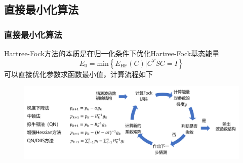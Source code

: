 \documentclass[10pt,aspectratio=43,mathserif,UTF8]{beamer}
\begin{document}
\subsection{直接最小化算法}
\begin{frame}
	\frametitle{直接最小化算法}
	Hartree-Fock方法的本质是在归一化条件下优化Hartree-Fock基态能量
	\begin{equation}
	E_{0}=\text{min}\left \{ E_{\text{HF}}(C)  | C^TSC=I   \right \}
	\end{equation}
	可以直接优化参数求函数最小值，计算流程如下

	\begin{figure}[htbp]
		\centering
		\includegraphics[width=1.0\textwidth]{figure/HF/QN5.png}
	\end{figure}

		

	
\end{frame}
\end{document}
